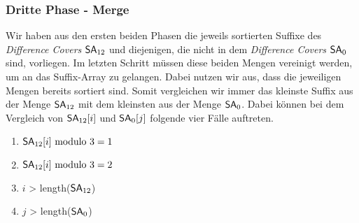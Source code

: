 \subsubsection{Dritte Phase - Merge}
\label{dc3:algorithmus:phase3}


Wir haben aus den ersten beiden Phasen die jeweils sortierten Suffixe des \emph{Difference Covers} $\sa_{12}$ und diejenigen, die nicht in dem \emph{Difference Covers} $\sa_{0}$ sind, vorliegen. Im letzten Schritt müssen diese beiden Mengen vereinigt werden, um an das Suffix-Array \sa zu gelangen. Dabei nutzen wir aus, dass die jeweiligen Mengen bereits sortiert sind. Somit vergleichen wir immer das kleinste Suffix aus der Menge $\sa_{12}$ mit dem kleinsten aus der Menge $\sa_{0}$. Dabei können bei dem Vergleich von $\sa_{12}[i]$ und $\sa_{0}[j]$ folgende vier Fälle auftreten.
\begin{enumerate}
	\item $\sa_{12}[i] \text{ modulo } 3 = 1$ \label{option1}
	\item $\sa_{12}[i] \text{ modulo } 3 = 2$ \label{option2}
	\item $i$ > length($\sa_{12}$) \label{option3}
	\item $j$ > length($\sa_{0}$) \label{option4}
\end{enumerate}

